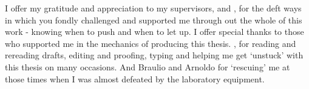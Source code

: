 \documentclass[
11pt, 
oneside,
english,
onehalfspacing,
onehalfspacing,
parskip,
headsepline,
]{MastersDoctoralThesis}
\begin{document}
\begin{acknowledgements}


I offer my gratitude and appreciation to my supervisors, \supname and \cosupname, for the deft ways in which you fondly challenged and supported me through out the whole of this work - knowing when to push and when to let up. I offer special thanks to those who supported me in the mechanics of producing this thesis. \supname, for reading and rereading drafts, editing and proofing, typing and helping me get ‘unstuck’ with this thesis on many occasions. And Braulio and Arnoldo for ‘rescuing’ me at those times when I was almost defeated by the laboratory equipment.

\end{acknowledgements}

\end{document}
